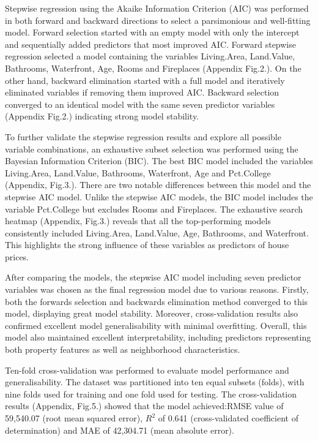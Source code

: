 \documentclass[letterpaper,9pt,twocolumn,twoside,]{pinp}
\begin{document}
Stepwise regression using the Akaike Information Criterion (AIC) was
performed in both forward and backward directions to select a
parsimonious and well-fitting model. Forward selection started with an
empty model with only the intercept and sequentially added predictors
that most improved AIC. Forward stepwise regression selected a model
containing the variables Living.Area, Land.Value, Bathrooms, Waterfront,
Age, Rooms and Fireplaces (Appendix Fig.2.). On the other hand, backward
elimination started with a full model and iteratively eliminated
variables if removing them improved AIC. Backward selection converged to
an identical model with the same seven predictor variables (Appendix
Fig.2.) indicating strong model stability.

To further validate the stepwise regression results and explore all
possible variable combinations, an exhaustive subset selection was
performed using the Bayesian Information Criterion (BIC). The best BIC
model included the variables Living.Area, Land.Value, Bathrooms,
Waterfront, Age and Pct.College (Appendix, Fig.3.). There are two
notable differences between this model and the stepwise AIC model.
Unlike the stepwise AIC models, the BIC model includes the variable
Pct.College but excludes Rooms and Fireplaces. The exhaustive search
heatmap (Appendix, Fig.3.) reveals that all the top-performing models
consistently included Living.Area, Land.Value, Age, Bathrooms, and
Waterfront. This highlights the strong influence of these variables as
predictors of house prices.

After comparing the models, the stepwise AIC model including seven
predictor variables was chosen as the final regression model due to
various reasons. Firstly, both the forwards selection and backwards
elimination method converged to this model, displaying great model
stability. Moreover, cross-validation results also confirmed excellent
model generalisability with minimal overfitting. Overall, this model
also maintained excellent interpretability, including predictors
representing both property features as well as neighborhood
characteristics.

Ten-fold cross-validation was performed to evaluate model performance
and generalisability. The dataset was partitioned into ten equal subsets
(folds), with nine folds used for training and one fold used for
testing. The cross-validation results (Appendix, Fig.5.) showed that the
model achieved:RMSE value of 59,540.07 (root mean squared error),
\(R^2\) of 0.641 (cross-validated coefficient of determination) and MAE
of 42,304.71 (mean absolute error).
\end{document}
